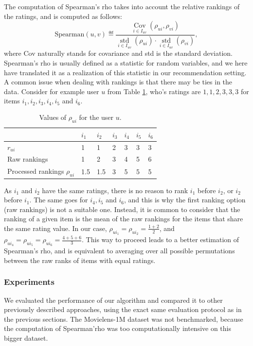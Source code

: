 The computation of Spearman's rho takes into account the relative rankings of
the ratings, and is computed as follows:
$$
\text{Spearman}(u, v) \eqdef \frac{\mathop{\text{Cov}}\limits_{i \in I_{uv}}(\rho_{ui},
\rho_{vi})}{\mathop{\text{std}}\limits_{i \in I_{uv}}(\rho_{ui}) \cdot
\mathop{\text{std}}\limits_{i \in
I_{uv}}(\rho_{vi})},
$$
where Cov naturally stands for covariance and std is the standard deviation.
Spearman's rho is usually defined as a statistic for random variables, and we
here have translated it as a realization of this statistic in our
recommendation setting. A common issue when dealing with rankings is that there
may be ties in the data. Consider for example user $u$ from Table
\ref{TAB:rankings}, who's ratings are $1, 1, 2, 3, 3, 3$ for items $i_1, i_2,
i_3, i_4, i_5$ and $i_6$.
\begin{table}[h!]
\centering
  \begin{tabular}{ l  l  l  l  l  l  l }
\toprule
    & $i_1$ & $i_2$ & $i_3$ & $i_4$ & $i_5$ & $i_6$\\
  \midrule
    $r_{ui}$ & 1 & 1 & 2 & 3 & 3 & 3\\
    Raw rankings & 1 & 2 & 3 & 4 & 5 & 6 \\
    Processed rankings $\rho_{ui}$ & 1.5 & 1.5 & 3 & 5 & 5 & 5 \\
\bottomrule
\end{tabular}
  \caption{Values of $\rho_{ui}$ for the user $u$.}
\label{TAB:rankings}
\end{table}
As $i_1$ and $i_2$ have the same ratings, there is no reason to rank $i_1$
before $i_2$, or $i_2$ before $i_1$. The same goes for $i_4, i_5$ and $i_6$,
and this is why the first ranking option (raw rankings) is not a suitable one.
Instead, it is common to consider that the ranking of a given item is the mean
of the raw rankings for the items that share the same rating value. In our case,
$\rho_{u{i_1}} = \rho_{u{i_2}} = \frac{1 + 2}{2}$, and $ \rho_{u{i_4}} =
\rho_{u{i_5}} =  \rho_{u{i_6}} = \frac{4 + 5 + 6}{3}$.
This way to
proceed leads to a better estimation of Spearman's rho, and is equivalent to
averaging over all possible permutations between the raw ranks of items with
equal ratings.



\subsubsection{Experiments}

We evaluated the performance of our algorithm and compared it to other
previously described approaches, using the exact same evaluation protocol as in
the previous sections. The Movielens-1M dataset was not benchmarked, because
the computation of Spearman'rho was too computationally intensive on this
bigger dataset.

